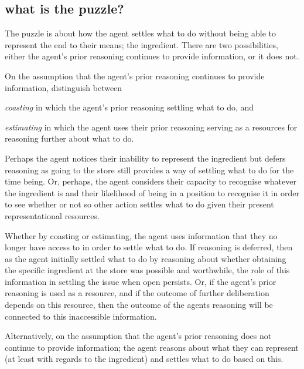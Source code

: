\documentclass[10pt]{article}
\begin{document}
\subsection{what is the puzzle?}
\label{sec:puzzle-puzzle-puzzle}

The puzzle is about how the agent settles what to do without being able to represent the end to their means; the ingredient.
There are two possibilities, either the agent's prior reasoning continues to provide information, or it does not.

On the assumption that the agent's prior reasoning continues to provide information, distinguish between
\begin{enumerate*}[label=\roman*)]
\item \emph{coasting} in which the agent's prior reasoning settling what to do, and
\item \emph{estimating} in which the agent uses their prior reasoning serving as a resources for reasoning further about what to do.
\end{enumerate*}
Perhaps the agent notices their inability to represent the ingredient but defers reasoning as going to the store still provides a way of settling what to do for the time being.
Or, perhaps, the agent considers their capacity to recognise whatever the ingredient is and their likelihood of being in a position to recognise it in order to see whether or not so other action settles what to do given their present representational resources.

Whether by coasting or estimating, the agent uses information that they no longer have access to in order to settle what to do.
If reasoning is deferred, then as the agent initially settled what to do by reasoning about whether obtaining the specific ingredient at the store was possible and worthwhile, the role of this information in settling the issue when open persists.
Or, if the agent's prior reasoning is used as a resource, and if the outcome of further deliberation depends on this resource, then the outcome of the agents reasoning will be connected to this inaccessible information.

Alternatively, on the assumption that the agent's prior reasoning does not continue to provide information; the agent reasons about what they can represent (at least with regards to the ingredient) and settles what to do based on this.
\end{document}
